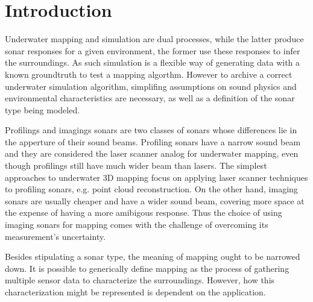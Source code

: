 \chapter{Introduction}


Underwater mapping and simulation are dual processes, while the latter produce
sonar responses for a given environment, the former use these responses to infer
the surroundings. As such simulation is a flexible way of generating data with a
known groundtruth to test a mapping algorthm. However to archive a correct
underwater simulation algorithm, simplifing assumptions on sound physics
and environmental characteristics are necessary, as well as a definition of the
sonar type being modeled.

Profilings and imagings sonars are two classes of sonars whose differences lie
in the apperture of their sound beams. Profiling sonars have a narrow sound beam
and they are considered the laser scanner analog for underwater mapping,
even though profilings still have much wider beam than lasers. The simplest
approaches to underwater 3D mapping focus on applying laser scanner techniques
to profiling sonars, e.g. point cloud reconstruction.
 On the other hand, imaging sonars are usually
cheaper and have a wider sound beam, covering more space at the expense of
having a more amibigous response. Thus the choice of using imaging
sonars for mapping comes with the challenge of overcoming its measurement's
uncertainty.



Besides stipulating a sonar type, the meaning of mapping ought to be narrowed
down. It is possible to generically define mapping as the process of gathering
multiple sensor data to characterize the surroundings. However, how this
characterization might be represented is dependent on the application.


